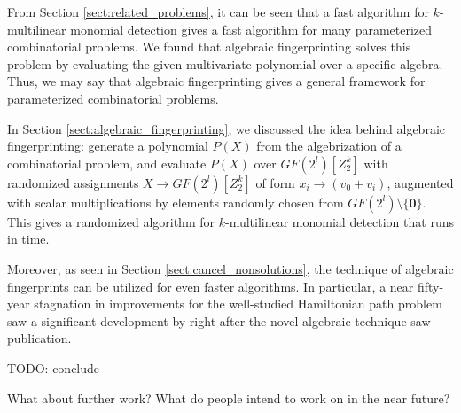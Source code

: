 From Section \ref{sect:related_problems}, 
it can be seen  
that a fast algorithm for $k$-multilinear monomial detection gives a 
fast algorithm for many parameterized combinatorial problems. 
We found that algebraic fingerprinting solves this problem by 
evaluating the given multivariate polynomial over a specific algebra. 
Thus, we 
may say that algebraic fingerprinting gives a general framework for 
parameterized combinatorial problems. 

In Section \ref{sect:algebraic_fingerprinting}, we discussed the idea behind 
algebraic fingerprinting: generate a polynomial $P(X)$ from the algebrization of 
a combinatorial problem, and evaluate $P(X)$ over $GF(2^{l})[Z_2^k]$ with 
randomized assignments $X \to GF(2^{l})[Z_2^k]$ of form 
$x_i \to (v_0 + v_i)$, augmented with scalar multiplications 
by elements randomly chosen from $GF(2^{l}) \setminus \{\mathbf{0}\}$. 
This gives a randomized algorithm for 
$k$-multilinear monomial detection that runs in  time.

Moreover, as seen in Section \ref{sect:cancel_nonsolutions}, 
the technique of algebraic fingerprints can be utilized for even 
faster algorithms. In particular, a near fifty-year stagnation 
in improvements for the well-studied Hamiltonian path problem saw 
a significant development by \citeauthor{Björklund14} right after 
the novel algebraic technique \cite{Koutis08} saw publication.

TODO: conclude

\begin{anamnote}[nomargin]{}
  What about further work?
  What do people intend to work on in the near future?
\end{anamnote}